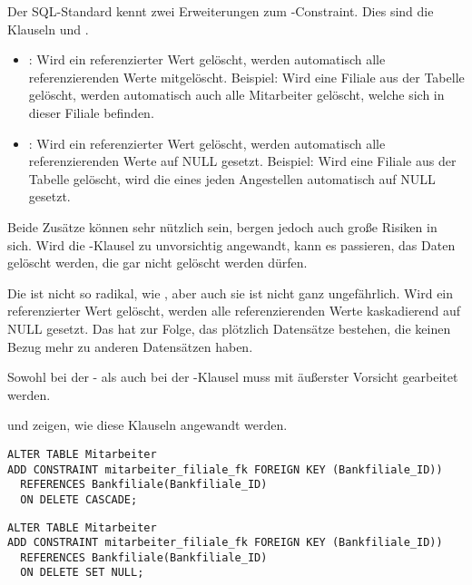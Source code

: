         Der SQL-Standard kennt zwei Erweiterungen zum -Constraint. Dies sind die Klauseln  und .
        \begin{itemize}
          \item {}: Wird ein referenzierter Wert gelöscht, werden automatisch alle referenzierenden Werte mitgelöscht. Beispiel: Wird eine Filiale aus der Tabelle  gelöscht, werden automatisch auch alle Mitarbeiter gelöscht, welche sich in dieser Filiale befinden.
          \item {}: Wird ein referenzierter Wert gelöscht, werden automatisch alle referenzierenden Werte auf NULL gesetzt. Beispiel: Wird eine Filiale aus der Tabelle  gelöscht, wird die  eines jeden Angestellen automatisch auf NULL gesetzt.
        \end{itemize}
        Beide Zusätze können sehr nützlich sein, bergen jedoch auch große Risiken in sich. Wird die -Klausel zu unvorsichtig angewandt, kann es passieren, das Daten gelöscht werden, die gar nicht gelöscht werden dürfen.

        Die  ist nicht so radikal, wie , aber auch sie ist nicht ganz ungefährlich. Wird ein referenzierter Wert gelöscht, werden alle referenzierenden Werte kaskadierend auf NULL gesetzt. Das hat zur Folge, das plötzlich Datensätze bestehen, die keinen Bezug mehr zu anderen Datensätzen haben.

        \begin{merke}
          Sowohl bei der - als auch bei der -Klausel muss mit äußerster Vorsicht gearbeitet werden.
        \end{merke}
         und  zeigen, wie diese Klauseln angewandt werden.
        \begin{lstlisting}[language=oracle_sql,caption={Ein Foreign Key-Constraint mit ON DELETE CASCADE-Klausel},label=sql09_17]
ALTER TABLE Mitarbeiter
ADD CONSTRAINT mitarbeiter_filiale_fk FOREIGN KEY (Bankfiliale_ID))
  REFERENCES Bankfiliale(Bankfiliale_ID)
  ON DELETE CASCADE;
        \end{lstlisting}

        \begin{lstlisting}[language=oracle_sql,caption={Ein Foreign Key-Constraint mit ON DELETE SET NULL-Klausel},label=sql09_18]
ALTER TABLE Mitarbeiter
ADD CONSTRAINT mitarbeiter_filiale_fk FOREIGN KEY (Bankfiliale_ID))
  REFERENCES Bankfiliale(Bankfiliale_ID)
  ON DELETE SET NULL;
        \end{lstlisting}
